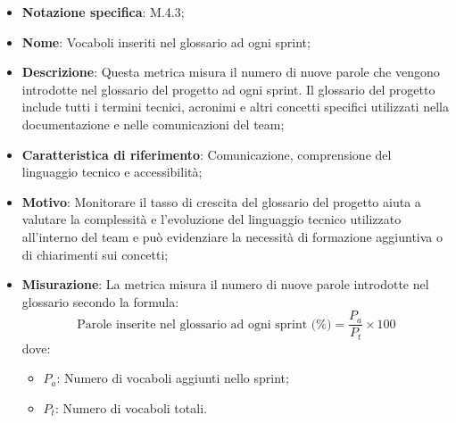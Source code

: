 \begin{itemize}
    \item \textbf{Notazione specifica}: M.4.3;
    \item \textbf{Nome}: Vocaboli inseriti nel glossario ad ogni sprint;
    \item \textbf{Descrizione}: Questa metrica misura il numero di nuove parole che vengono introdotte nel glossario del progetto ad ogni sprint. Il glossario del progetto include tutti i termini tecnici, acronimi e altri concetti specifici utilizzati nella documentazione e nelle comunicazioni del team;
    \item \textbf{Caratteristica di riferimento}: Comunicazione, comprensione del linguaggio tecnico e accessibilità;
    \item \textbf{Motivo}: Monitorare il tasso di crescita del glossario del progetto aiuta a valutare la complessità e l'evoluzione del linguaggio tecnico utilizzato all'interno del team e può evidenziare la necessità di formazione aggiuntiva o di chiarimenti sui concetti;
    \item \textbf{Misurazione}: La metrica misura il numero di nuove parole introdotte nel glossario secondo la formula:
    \[
        \text{Parole inserite nel glossario ad ogni sprint (\%)} =\frac{P_{a}}{P_{t}} \times 100 
    \]
    dove:
    \begin{itemize}
        \item $P_{a}$: Numero di vocaboli aggiunti nello sprint;
        \item $P_{t}$: Numero di vocaboli totali.
    \end{itemize}
    
    
\end{itemize}
